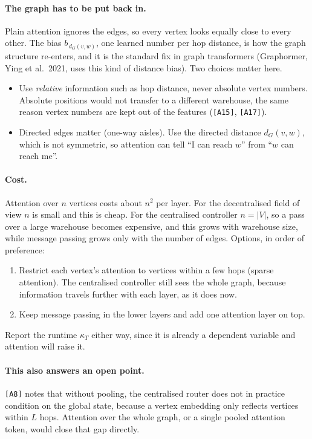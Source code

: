 \documentclass[11pt,a4paper]{article}
\begin{document}
\paragraph{The graph has to be put back in.} Plain attention ignores the
edges, so every vertex looks equally close to every other. The bias
$b_{\,d_G(v,w)}$, one learned number per hop distance, is how the graph
structure re-enters, and it is the standard fix in graph transformers
(Graphormer, Ying et al.\ 2021, uses this kind of distance bias). Two
choices matter here.
\begin{itemize}[leftmargin=*]
  \item Use \emph{relative} information such as hop distance, never
        absolute vertex numbers. Absolute positions would not transfer to a
        different warehouse, the same reason vertex numbers are kept out of
        the features (\texttt{[A15]}, \texttt{[A17]}).
  \item Directed edges matter (one-way aisles). Use the directed distance
        $d_G(v,w)$, which is not symmetric, so attention can tell ``I can
        reach $w$'' from ``$w$ can reach me''.
\end{itemize}

\paragraph{Cost.} Attention over $n$ vertices costs about $n^2$ per layer.
For the decentralised field of view $n$ is small and this is cheap. For the
centralised controller $n = |V|$, so a pass over a large warehouse becomes
expensive, and this grows with warehouse size, while message passing grows
only with the number of edges. Options, in order of preference:
\begin{enumerate}[leftmargin=*]
  \item Restrict each vertex's attention to vertices within a few hops
        (sparse attention). The centralised controller still sees the whole
        graph, because information travels further with each layer, as it
        does now.
  \item Keep message passing in the lower layers and add one attention
        layer on top.
\end{enumerate}
Report the runtime $\kappa_T$ either way, since it is already a dependent
variable and attention will raise it.

\paragraph{This also answers an open point.} \texttt{[A8]} notes that
without pooling, the centralised router does not in practice condition on
the global state, because a vertex embedding only reflects vertices within
$L$ hops. Attention over the whole graph, or a single pooled attention
token, would close that gap directly.
\end{document}
